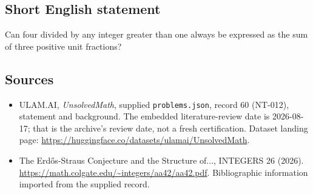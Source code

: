 \documentclass[11pt,a4paper]{article}
\begin{document}
\subsection{Short English statement}

Can four divided by any integer greater than one always be expressed as the sum of three positive unit fractions?

\subsection{Sources}

{\small

\begin{itemize}

\item[\hypertarget{source:60:1}{S1}] ULAM.AI, \emph{UnsolvedMath}, supplied \texttt{problems.json}, record 60 (NT-012), statement and background. The embedded literature-review date is 2026-08-17; that is the archive’s review date, not a fresh certification. Dataset landing page: \url{https://huggingface.co/datasets/ulamai/UnsolvedMath}.

\item[\hypertarget{source:60:2}{S2}] The Erdős-Straus Conjecture and the Structure of..., INTEGERS 26 (2026). \url{https://math.colgate.edu/~integers/aa42/aa42.pdf}. Bibliographic information imported from the supplied record.

\end{itemize}

}

\label{end:60}
\end{document}
